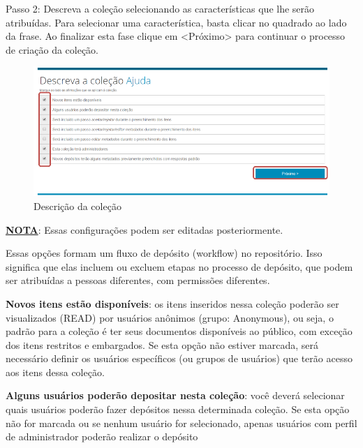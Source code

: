 \documentclass[12pt,hidelinks]{article}
\begin{document}
\newpage
    Passo 2: Descreva a coleção selecionando as características que lhe serão atribuídas. Para selecionar uma característica, basta clicar no quadrado ao lado da frase. Ao finalizar esta fase clique em <Próximo> para continuar o processo de criação da coleção.
    
    \begin{figure}[!htp]
                \centering
                \includegraphics[scale=0.8]{figura/Figura34.png}
                \caption{Descrição da coleção}
            \label{Rotulo}
        \end{figure}
        
    \textbf{\underline{NOTA}}: Essas configurações podem ser editadas posteriormente. 
    
    \singlespacing
    Essas opções formam um fluxo de depósito (workflow) no repositório. Isso significa que elas incluem ou excluem etapas no processo de depósito, que podem ser atribuídas a pessoas diferentes, com permissões diferentes.
    \singlespacing
    
    \textbf{Novos itens estão disponíveis}: os itens inseridos nessa coleção poderão ser visualizados (READ) por usuários anônimos (grupo: Anonymous), ou seja, o padrão para a coleção é ter seus documentos disponíveis ao público, com exceção dos itens restritos e embargados. Se esta opção não estiver marcada, será necessário definir os usuários específicos (ou grupos de usuários) que terão acesso aos itens dessa coleção.
    
    \singlespacing
    
    \textbf{Alguns usuários poderão depositar nesta coleção}: você deverá selecionar quais usuários poderão fazer depósitos nessa determinada coleção. Se esta opção não for marcada ou se nenhum usuário for selecionado, apenas usuários com perfil de administrador poderão realizar o depósito
    
    \singlespacing
    
\end{document}
